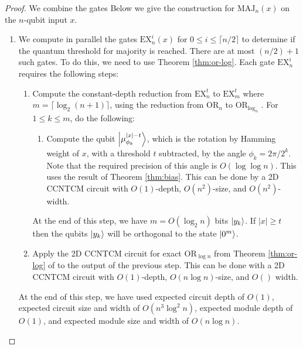 \begin{proof}
We combine the gates 
Below we give the construction for $\text{MAJ}_{n}(x)$ on the
$n$-qubit input $x$.



\begin{enumerate}

\item
We compute in parallel the gates $\text{EX}^i_{n}(x)$ for
$0 \le i \le \lceil n/2 \rceil$ to determine if the quantum
threshold for majority is reached. There are at most $(n/2) + 1$
such gates. To do this, we need to use Theorem \ref{thm:or-log}.
Each gate $\text{EX}^i_{n}$ requires the following steps:

\begin{enumerate}
\item 
Compute the constant-depth reduction from $\text{EX}^t_{n}$ to
$\text{EX}^t_{m}$ where $m = \lceil \log_2(n+1) \rceil$, using
the reduction from $\text{OR}_n$ to $\text{OR}_{\log_n}$ \cite{Hoyer2002}.
For $1 \le k \le m$, do the following:

\begin{enumerate}
\item
Compute the qubit $\left\vert{\mu^{|x|-t}_{\phi_k}}\right\rangle$, which is the rotation by Hamming 
weight of $x$, with a threshold $t$ subtracted, by the angle $\phi_k = 2\pi / 2^k$. Note that the
required precision
of this angle is $O(\log \log n)$. This uses the result of Theorem \ref{thm:bias}.
This can be done by a \textsf{2D CCNTCM} circuit
with $O(1)$-depth, $O(n^2)$-size, and $O(n^2)$-width.
\end{enumerate}

At the end of this step, we have $m = O(\log_2 n)$ bits $\left\vert{y_k}\right\rangle$. If
$|x| \ge t$ then the qubits $\left\vert{y_k}\right\rangle$ will be orthogonal
to the state $\left\vert{0^m}\right\rangle$.

\item
Apply the \textsf{2D CCNTCM} circuit for exact $\text{OR}_{\log n}$ from
Theorem \ref{thm:or-log} of
\cite{Takahashi2011} to the output of the previous step. This can
be done with a \textsf{2D CCNTCM} circuit with $O(1)$-depth, $O(n \log n)$-size,
and $O()$ width.

\end{enumerate}

At the end of this step, we have used expected circuit depth of
$O(1)$, expected circuit size and width of $O(n^3 \log^2 n)$,
expected module depth of $O(1)$, and expected module size and
width of $O(n \log n)$.


\end{enumerate}
\end{proof}
